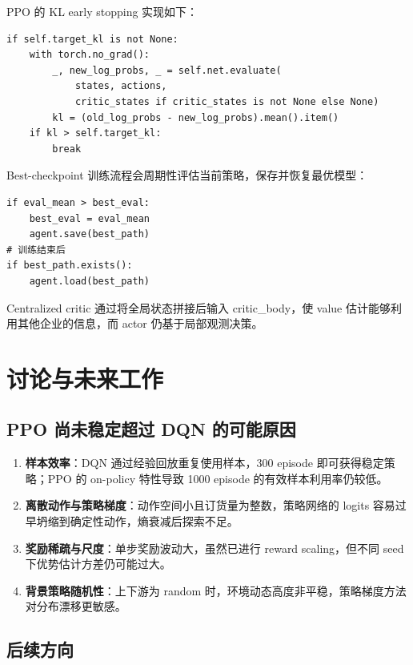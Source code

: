 \documentclass{article}
\begin{document}
PPO 的 KL early stopping 实现如下：

\begin{lstlisting}
if self.target_kl is not None:
    with torch.no_grad():
        _, new_log_probs, _ = self.net.evaluate(
            states, actions,
            critic_states if critic_states is not None else None)
        kl = (old_log_probs - new_log_probs).mean().item()
    if kl > self.target_kl:
        break
\end{lstlisting}

Best-checkpoint 训练流程会周期性评估当前策略，保存并恢复最优模型：

\begin{lstlisting}
if eval_mean > best_eval:
    best_eval = eval_mean
    agent.save(best_path)
# 训练结束后
if best_path.exists():
    agent.load(best_path)
\end{lstlisting}

Centralized critic 通过将全局状态拼接后输入 critic\_body，使 value 估计能够利用其他企业的信息，而 actor 仍基于局部观测决策。

\section{讨论与未来工作}

\subsection{PPO 尚未稳定超过 DQN 的可能原因}

\begin{enumerate}[label=(\arabic*)]
  \item \textbf{样本效率}：DQN 通过经验回放重复使用样本，300 episode 即可获得稳定策略；PPO 的 on-policy 特性导致 1000 episode 的有效样本利用率仍较低。
  \item \textbf{离散动作与策略梯度}：动作空间小且订货量为整数，策略网络的 logits 容易过早坍缩到确定性动作，熵衰减后探索不足。
  \item \textbf{奖励稀疏与尺度}：单步奖励波动大，虽然已进行 reward scaling，但不同 seed 下优势估计方差仍可能过大。
  \item \textbf{背景策略随机性}：上下游为 random 时，环境动态高度非平稳，策略梯度方法对分布漂移更敏感。
\end{enumerate}

\subsection{后续方向}
\end{document}
